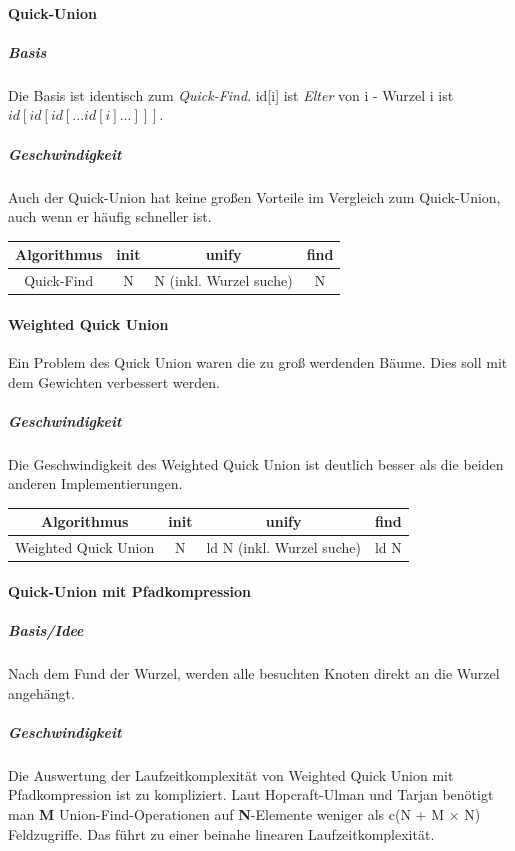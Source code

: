 \documentclass{book}
\begin{document}
\paragraph{Quick-Union}
\subparagraph*{Basis} Die Basis ist identisch zum \textit{Quick-Find}. id[i] ist \textit{Elter} von i - Wurzel i ist $id[id[id[...id[i]...]]]$.
\subparagraph*{Geschwindigkeit} Auch der Quick-Union hat keine großen Vorteile im Vergleich zum Quick-Union, auch wenn er häufig schneller ist.
\begin{center}
	\begin{tabular}{|c|c|c|c|}
		\hline
		\textbf{Algorithmus} & \textbf{init} & \textbf{unify} & \textbf{find}  \\
		\hline
		Quick-Find & N & N (inkl. Wurzel suche) & N \\
		\hline
	\end{tabular}
	\end{center}
\paragraph{Weighted Quick Union} Ein Problem des Quick Union waren die zu groß werdenden Bäume. 
Dies soll mit dem Gewichten verbessert werden. 

\subparagraph*{Geschwindigkeit} Die Geschwindigkeit des Weighted Quick Union 
ist deutlich besser als die beiden anderen Implementierungen.

\begin{center}
	\begin{tabular}{|c|c|c|c|}
		\hline
		\textbf{Algorithmus} & \textbf{init} & \textbf{unify} & \textbf{find}  \\
		\hline
		Weighted Quick Union & N & ld N (inkl. Wurzel suche) & ld N \\
		\hline
	\end{tabular}
	\end{center}

\paragraph{Quick-Union mit Pfadkompression}
\subparagraph*{Basis/Idee} Nach dem Fund der Wurzel, werden alle besuchten Knoten direkt an die Wurzel angehängt.
\subparagraph*{Geschwindigkeit} Die Auswertung der Laufzeitkomplexität von Weighted Quick Union mit Pfadkompression ist zu kompliziert.
Laut Hopcraft-Ulman und Tarjan benötigt man \textbf{M} Union-Find-Operationen auf \textbf{N}-Elemente weniger als c(N + M $\times$ N) Feldzugriffe.
Das führt zu einer beinahe linearen Laufzeitkomplexität.
\end{document}
